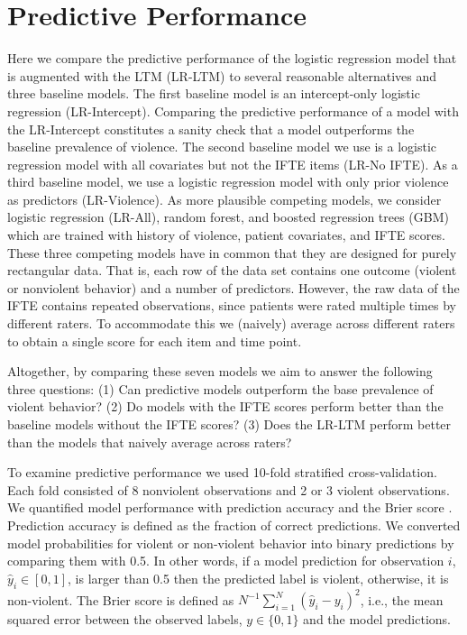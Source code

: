 \documentclass[a4paper,11pt]{article}
\newcommand{\DB}[1]{\todo[inline, color=colorDon,caption={}]{DB: {#1}}}
\begin{document}

\section{Predictive Performance}
\DB{verander LR naar LR-All om aan te geven dat daar alles in zit}
Here we compare the predictive performance of the logistic regression model that is augmented with the LTM (LR-LTM) to several reasonable alternatives and three baseline models.
The first baseline model is an intercept-only logistic regression (LR-Intercept). 
Comparing the predictive performance of a model with the LR-Intercept constitutes a sanity check that a model outperforms the baseline prevalence of violence.
The second baseline model we use is a logistic regression model with all covariates but not the IFTE items (LR-No IFTE).
As a third baseline model, we use a logistic regression model with only prior violence as predictors (LR-Violence).
As more plausible competing models, we consider logistic regression (LR-All), random forest, and boosted regression trees (GBM) which are trained with history of violence, patient covariates, and IFTE scores.
These three competing models have in common that they are designed for purely rectangular data.
That is, each row of the data set contains one outcome (violent or nonviolent behavior) and a number of predictors.
However, the raw data of the IFTE contains repeated observations, since patients were rated multiple times by different raters.
To accommodate this we (naively) average across different raters to obtain a single score for each item and time point.

Altogether, by comparing these seven models we aim to answer the following three questions: (1) Can predictive models outperform the base prevalence of violent behavior? (2) Do models with the IFTE scores perform better than the baseline models without the IFTE scores? (3) Does the LR-LTM perform better than the models that naively average across raters?

To examine predictive performance we used 10-fold stratified cross-validation.
Each fold consisted of 8 nonviolent observations and 2 or 3 violent observations.
We quantified model performance with prediction accuracy and the Brier score \parencite{brier1950verification}.
Prediction accuracy is defined as the fraction of correct predictions.
We converted model probabilities for violent or non-violent behavior into binary predictions by comparing them with 0.5.
In other words, if a model prediction for observation $i$, $\hat{y}_i\in [0, 1]$, is larger than 0.5 then the predicted label is violent, otherwise, it is non-violent.
The Brier score is defined as $N^{-1}\sum_{i=1}^N\left(\hat{y}_i-y_{i}\right)^2$, i.e., the mean squared error between the observed labels, $y\in\{0,1\}$ and the model predictions.
\end{document}
